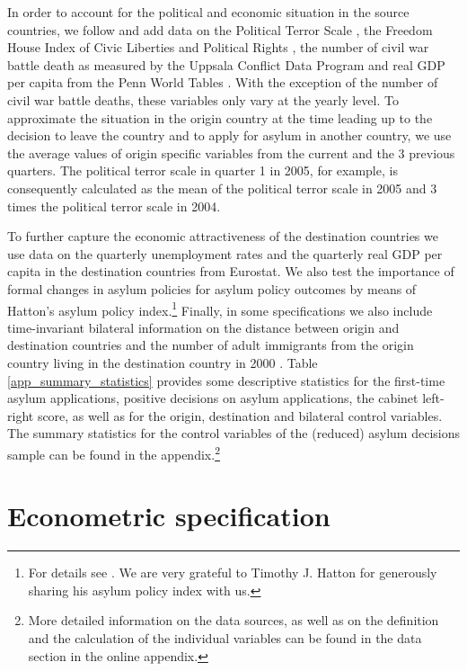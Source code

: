 \documentclass[a4paper,12pt]{article}
\begin{document}
In order to account for the political and economic situation in the source countries, we follow \cite{hatton2016} and add data on the Political Terror Scale \citep{PTS2016}, the Freedom House Index of Civic Liberties and Political Rights \citep{FHI2017}, the number of civil war battle death as measured by the Uppsala Conflict Data Program \citep{Uppsala2017} and real GDP per capita from the Penn World Tables \citep{PWT2015}.  With the exception of the number of civil war battle deaths, these variables only vary at the yearly level. To approximate the situation in the origin country at the time leading up to the decision to leave the country and to apply for asylum in another country, we use the average values of origin specific variables from the current and the 3 previous quarters. The political terror scale in quarter 1 in 2005, for example, is consequently calculated as the mean of the political terror scale in 2005 and 3 times the political terror scale in 2004. 

To further capture the economic attractiveness of the destination countries we use data on the quarterly unemployment rates and the quarterly real GDP per capita in the destination countries from Eurostat. We also test the importance of formal changes in asylum policies for asylum policy outcomes by means of Hatton's asylum policy index.\footnote{For details see \citet{hatton2009}. We are very grateful to Timothy J. Hatton for generously sharing his asylum policy index with us.} Finally, in some specifications we also include time-invariant bilateral information on the distance between origin and destination countries \citep{distance2017} and the number of adult immigrants from the origin country living in the destination country in 2000 \citep{Artucc2015}. Table \ref{app_summary_statistics} provides some descriptive statistics for the first-time asylum applications, positive decisions on asylum applications, the cabinet left-right score, as well as for the origin, destination and bilateral control variables. The summary statistics for the control variables of the (reduced) asylum decisions sample can be found in the appendix.\footnote{More detailed information on the data sources, as well as on the definition and the calculation of the individual variables can be found in the data section in the online appendix.}




\section{Econometric specification} \label{sec:econometric}
\end{document}
